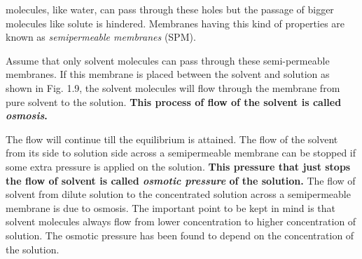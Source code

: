\documentclass[11pt,a4paper]{article}
\begin{document}
\noindent\hfill\begin{minipage}[t]{0.765\textwidth}
molecules, like water, can pass through these holes but the passage of bigger molecules like solute is hindered. Membranes having this kind of properties are known as \textit{semipermeable membranes} (SPM).

\hspace*{1.5em}Assume that only solvent molecules can pass through these semi-permeable membranes. If this membrane is placed between the solvent and solution as shown in Fig. 1.9, the solvent molecules will flow through the membrane from pure solvent to the solution. \textbf{This process of flow of the solvent is called \textit{osmosis}.}

\hspace*{1.5em}The flow will continue till the equilibrium is attained. The flow of the solvent from its side to solution side across a semipermeable membrane can be stopped if some extra pressure is applied on the solution. \textbf{This pressure that just stops the flow of solvent is called \textit{osmotic pressure} of the solution.} The flow of solvent from dilute solution to the concentrated solution across a semipermeable membrane is due to osmosis. The important point to be kept in mind is that solvent molecules always flow from lower concentration to higher concentration of solution. The osmotic pressure has been found to depend on the concentration of the solution.
\end{minipage}
\end{document}
